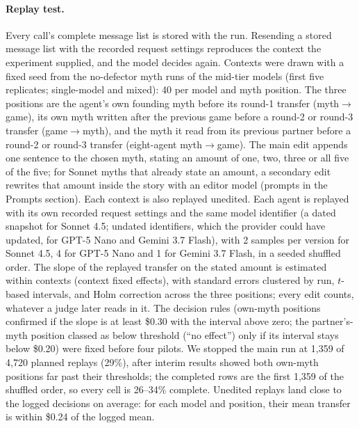 \paragraph{Replay test.} Every call's complete message list is stored with the run. Resending a stored message list with the recorded request settings reproduces the context the experiment supplied, and the model decides again. Contexts were drawn with a fixed seed from the no-defector myth runs of the mid-tier models (first five replicates; single-model and mixed): 40 per model and myth position. The three positions are the agent's own founding myth before its round-1 transfer (myth$\rightarrow$game), its own myth written after the previous game before a round-2 or round-3 transfer (game$\rightarrow$myth), and the myth it read from its previous partner before a round-2 or round-3 transfer (eight-agent myth$\rightarrow$game). The main edit appends one sentence to the chosen myth, stating an amount of one, two, three or all five of the five; for Sonnet myths that already state an amount, a secondary edit rewrites that amount inside the story with an editor model (prompts in the Prompts section). Each context is also replayed unedited. Each agent is replayed with its own recorded request settings and the same model identifier (a dated snapshot for Sonnet 4.5; undated identifiers, which the provider could have updated, for GPT-5 Nano and Gemini 3.7 Flash), with 2 samples per version for Sonnet 4.5, 4 for GPT-5 Nano and 1 for Gemini 3.7 Flash, in a seeded shuffled order. The slope of the replayed transfer on the stated amount is estimated within contexts (context fixed effects), with standard errors clustered by run, $t$-based intervals, and Holm correction across the three positions; every edit counts, whatever a judge later reads in it. The decision rules (own-myth positions confirmed if the slope is at least \$0.30 with the interval above zero; the partner's-myth position classed as below threshold (``no effect'') only if its interval stays below \$0.20) were fixed before four pilots. We stopped the main run at 1,359 of 4,720 planned replays (29\%), after interim results showed both own-myth positions far past their thresholds; the completed rows are the first 1,359 of the shuffled order, so every cell is 26--34\% complete. Unedited replays land close to the logged decisions on average: for each model and position, their mean transfer is within \$0.24 of the logged mean.

